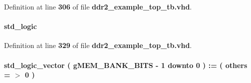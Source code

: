 Definition at line {\bf 306} of file {\bf ddr2\+\_\+example\+\_\+top\+\_\+tb.\+vhd}.

\paragraph[{we\+\_\+n\+\_\+delayed}]{ {\bfseries \textcolor{comment}{std\+\_\+logic}\textcolor{vhdlchar}{ }} \hspace{0.3cm}{\ttfamily [Signal]}}\label{classddr2__example__top__tb_1_1rtl_a8a56fd4c556848ebfb983c65090d7c07}


Definition at line {\bf 329} of file {\bf ddr2\+\_\+example\+\_\+top\+\_\+tb.\+vhd}.

\paragraph[{zero\+\_\+one}]{ {\bfseries \textcolor{comment}{std\+\_\+logic\+\_\+vector}\textcolor{vhdlchar}{ }\textcolor{vhdlchar}{(}\textcolor{vhdlchar}{ }\textcolor{vhdlchar}{ }\textcolor{vhdlchar}{ }\textcolor{vhdlchar}{ }{\bfseries {\bf g\+M\+E\+M\+\_\+\+B\+A\+N\+K\+\_\+\+B\+I\+TS}} \textcolor{vhdlchar}{-\/}\textcolor{vhdlchar}{ } \textcolor{vhdldigit}{1} \textcolor{vhdlchar}{ }\textcolor{keywordflow}{downto}\textcolor{vhdlchar}{ }\textcolor{vhdlchar}{ } \textcolor{vhdldigit}{0} \textcolor{vhdlchar}{ }\textcolor{vhdlchar}{)}\textcolor{vhdlchar}{ }\textcolor{vhdlchar}{ }\textcolor{vhdlchar}{ }\textcolor{vhdlchar}{\+:}\textcolor{vhdlchar}{=}\textcolor{vhdlchar}{ }\textcolor{vhdlchar}{(}\textcolor{vhdlchar}{ }\textcolor{vhdlchar}{ }\textcolor{keywordflow}{others}\textcolor{vhdlchar}{ }\textcolor{vhdlchar}{ }\textcolor{vhdlchar}{=}\textcolor{vhdlchar}{ }\textcolor{vhdlchar}{$>$}\textcolor{vhdlchar}{ }\textcolor{vhdlchar}{\textquotesingle{}}\textcolor{vhdlchar}{ } \textcolor{vhdldigit}{0} \textcolor{vhdlchar}{ }\textcolor{vhdlchar}{\textquotesingle{}}\textcolor{vhdlchar}{ }\textcolor{vhdlchar}{)}\textcolor{vhdlchar}{ }} \hspace{0.3cm}{\ttfamily [Signal]}}\label{classddr2__example__top__tb_1_1rtl_a6199b9e00210a9af878a5ed813c233cf}


